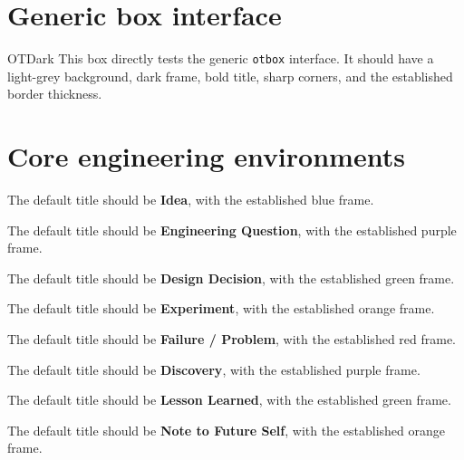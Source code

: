 \documentclass{otengineering}
\begin{document}
\section{Generic box interface}

\begin{otbox}{OTDark}
    This box directly tests the generic \texttt{otbox} interface. It should
    have a light-grey background, dark frame, bold title, sharp corners, and
    the established border thickness.
\end{otbox}

\section{Core engineering environments}

\begin{idea}
    The default title should be \textbf{Idea}, with the established blue
    frame.
\end{idea}

\begin{questionbox}
    The default title should be \textbf{Engineering Question}, with the
    established purple frame.
\end{questionbox}

\begin{decision}
    The default title should be \textbf{Design Decision}, with the
    established green frame.
\end{decision}

\begin{experiment}
    The default title should be \textbf{Experiment}, with the established
    orange frame.
\end{experiment}

\begin{failure}
    The default title should be \textbf{Failure / Problem}, with the
    established red frame.
\end{failure}

\begin{discovery}
    The default title should be \textbf{Discovery}, with the established
    purple frame.
\end{discovery}

\begin{lesson}
    The default title should be \textbf{Lesson Learned}, with the
    established green frame.
\end{lesson}

\begin{futurememo}
    The default title should be \textbf{Note to Future Self}, with the
    established orange frame.
\end{futurememo}
\end{document}

